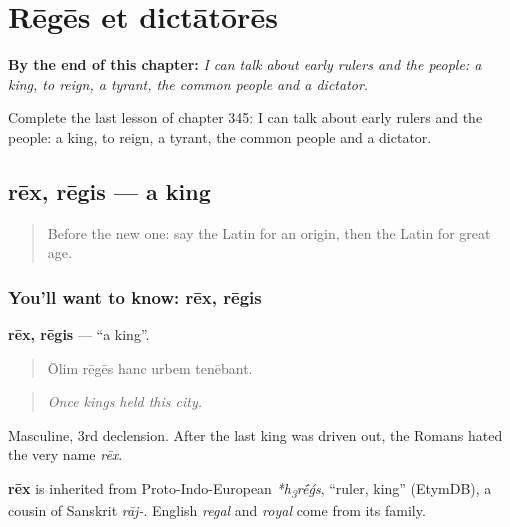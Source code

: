 
\chapter{Rēgēs et dictātōrēs}
\label{ch:la-reges-et-dictatores}

\begin{chapteropening}
\textbf{By the end of this chapter:} \emph{I can talk about early rulers and the people: a king, to reign, a tyrant, the common people and a dictator.}

Complete the last lesson of chapter 345: I can talk about early rulers and the people: a king, to reign, a tyrant, the common people and a dictator.
\end{chapteropening}

\section[rēx, rēgis]{rēx, rēgis — a king}

\label{lesson:LA-C345-rex}



\begin{quote}
Before the new one: say the Latin for an origin, then the Latin for great age.
\end{quote}

\subsection*{You'll want to know: rēx, rēgis}
\textbf{rēx, rēgis} — \textquotedblleft{}a king\textquotedblright{}.

\begin{quote}
Ōlim rēgēs hanc urbem tenēbant.
\end{quote}

\begin{quote}
\emph{Once kings held this city.}
\end{quote}

Masculine, 3rd declension. After the last king was driven out, the Romans hated the very name \emph{rēx}.

\begin{cousinweb}
\textbf{rēx} is inherited from Proto-Indo-European \emph{*h\textsubscript{3}r\'{\={e}}ǵs}, \textquotedblleft{}ruler, king\textquotedblright{} (EtymDB), a cousin of Sanskrit \emph{rāj-}. English \emph{regal} and \emph{royal} come from its family.
\end{cousinweb}

